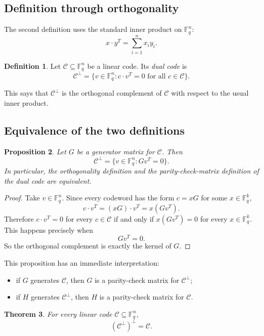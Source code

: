\documentclass[11pt]{article}
\newtheorem{proposition}{Proposition}[section]
\newtheorem{theorem}[proposition]{Theorem}
\theoremstyle{definition}
\newtheorem{definition}[proposition]{Definition}
\theoremstyle{remark}
\newcommand{\F}{\mathbb{F}}
\newcommand{\code}{\mathcal{C}}
\newcommand{\dual}[1]{#1^{\perp}}
\begin{document}
\subsection{Definition through orthogonality}

The second definition uses the standard inner product on $\F_q^n$:
\[
x\cdot y^T=\sum_{i=1}^n x_i y_i.
\]

\begin{definition}
Let $\code\subseteq \F_q^n$ be a linear code. Its \emph{dual code} is
\[
\dual{\code}=\{v\in\F_q^n:c\cdot v^T=0\text{ for all }c\in\code\}.
\]
\end{definition}

This says that $\dual{\code}$ is the orthogonal complement of $\code$ with respect to the usual inner product.

\subsection{Equivalence of the two definitions}

\begin{proposition}
Let $G$ be a generator matrix for $\code$. Then
\[
\dual{\code}=\{v\in\F_q^n:Gv^T=0\}.
\]
In particular, the orthogonality definition and the parity-check-matrix definition of the dual code are equivalent.
\end{proposition}

\begin{proof}
Take $v\in\F_q^n$. Since every codeword has the form $c=xG$ for some $x\in\F_q^k$,
\[
c\cdot v^T=(xG)\cdot v^T=x(Gv^T).
\]
Therefore $c\cdot v^T=0$ for every $c\in\code$ if and only if $x(Gv^T)=0$ for every $x\in\F_q^k$. This happens precisely when
\[
Gv^T=0.
\]
So the orthogonal complement is exactly the kernel of $G$.
\end{proof}

This proposition has an immediate interpretation:
\begin{itemize}[leftmargin=1.4em]
    \item if $G$ generates $\code$, then $G$ is a parity-check matrix for $\dual{\code}$;
    \item if $H$ generates $\dual{\code}$, then $H$ is a parity-check matrix for $\code$.
\end{itemize}

\begin{theorem}
For every linear code $\code\subseteq \F_q^n$,
\[
(\dual{\code})^{\perp}=\code.
\]
\end{theorem}
\end{document}
